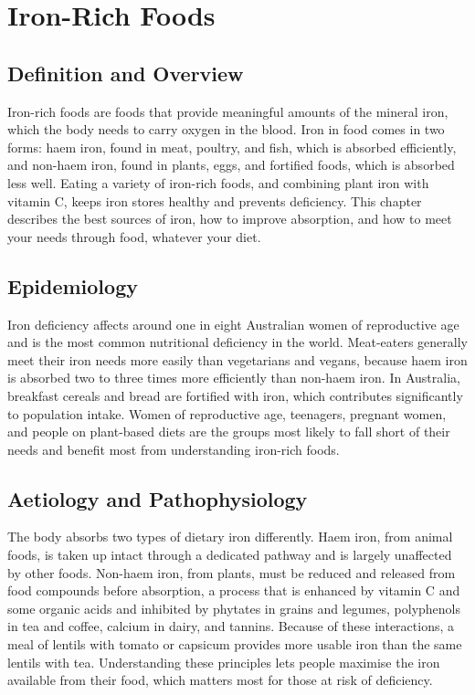 \chapter{Iron-Rich Foods}

\section*{Definition and Overview}
Iron-rich foods are foods that provide meaningful amounts of the mineral iron, which the body needs to carry oxygen in the blood. Iron in food comes in two forms: haem iron, found in meat, poultry, and fish, which is absorbed efficiently, and non-haem iron, found in plants, eggs, and fortified foods, which is absorbed less well. Eating a variety of iron-rich foods, and combining plant iron with vitamin C, keeps iron stores healthy and prevents deficiency. This chapter describes the best sources of iron, how to improve absorption, and how to meet your needs through food, whatever your diet.

\section*{Epidemiology}
Iron deficiency affects around one in eight Australian women of reproductive age and is the most common nutritional deficiency in the world. Meat-eaters generally meet their iron needs more easily than vegetarians and vegans, because haem iron is absorbed two to three times more efficiently than non-haem iron. In Australia, breakfast cereals and bread are fortified with iron, which contributes significantly to population intake. Women of reproductive age, teenagers, pregnant women, and people on plant-based diets are the groups most likely to fall short of their needs and benefit most from understanding iron-rich foods.

\section*{Aetiology and Pathophysiology}
The body absorbs two types of dietary iron differently. Haem iron, from animal foods, is taken up intact through a dedicated pathway and is largely unaffected by other foods. Non-haem iron, from plants, must be reduced and released from food compounds before absorption, a process that is enhanced by vitamin C and some organic acids and inhibited by phytates in grains and legumes, polyphenols in tea and coffee, calcium in dairy, and tannins. Because of these interactions, a meal of lentils with tomato or capsicum provides more usable iron than the same lentils with tea. Understanding these principles lets people maximise the iron available from their food, which matters most for those at risk of deficiency.

